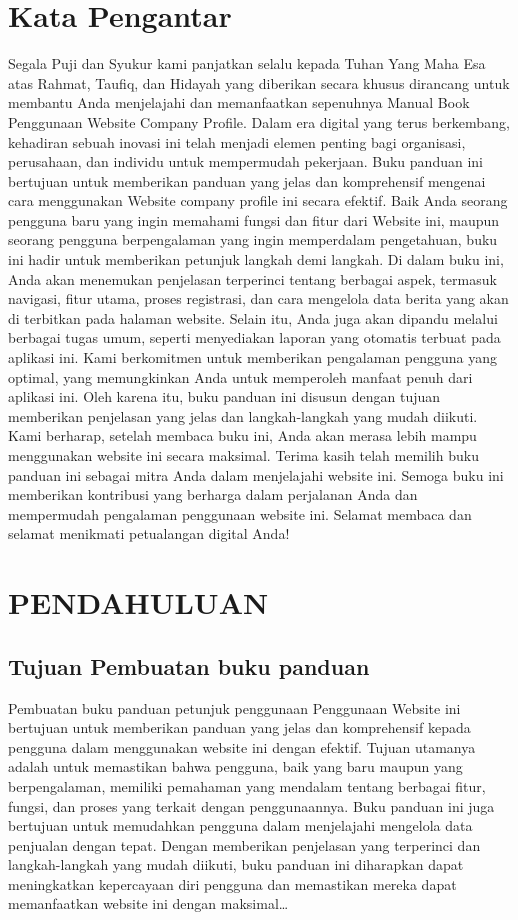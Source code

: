 \documentclass[a4paper,12 pt]{article}
\begin{document}
\section{Kata Pengantar}
Segala Puji dan Syukur kami panjatkan selalu kepada Tuhan Yang Maha Esa atas Rahmat, Taufiq, dan Hidayah yang diberikan secara khusus dirancang untuk membantu Anda menjelajahi dan memanfaatkan sepenuhnya Manual Book Penggunaan Website Company Profile. Dalam era digital yang terus berkembang, kehadiran sebuah inovasi ini telah menjadi elemen penting bagi organisasi, perusahaan, dan individu untuk mempermudah pekerjaan. 
Buku panduan ini bertujuan untuk memberikan panduan yang jelas dan komprehensif mengenai cara menggunakan Website company profile ini secara efektif. Baik Anda seorang pengguna baru yang ingin memahami fungsi dan fitur dari Website ini, maupun seorang pengguna berpengalaman yang ingin memperdalam pengetahuan, buku ini hadir untuk memberikan petunjuk langkah demi langkah. 
Di dalam buku ini, Anda akan menemukan penjelasan terperinci tentang berbagai aspek, termasuk navigasi, fitur utama, proses registrasi, dan cara mengelola data berita yang akan di terbitkan pada halaman website. Selain itu, Anda juga akan dipandu melalui berbagai tugas umum, seperti menyediakan laporan yang otomatis terbuat pada aplikasi ini. 
Kami berkomitmen untuk memberikan pengalaman pengguna yang optimal, yang memungkinkan Anda untuk memperoleh manfaat penuh dari aplikasi ini. Oleh karena itu, buku panduan ini disusun dengan tujuan memberikan penjelasan yang jelas dan langkah-langkah yang mudah diikuti. Kami berharap, setelah membaca buku ini, Anda akan merasa lebih mampu menggunakan website ini secara maksimal. 
Terima kasih telah memilih buku panduan ini sebagai mitra Anda dalam menjelajahi website ini. Semoga buku ini memberikan kontribusi yang berharga dalam perjalanan Anda dan mempermudah pengalaman penggunaan website ini. 
Selamat membaca dan selamat menikmati petualangan digital Anda!
\clearpage

\tableofcontents
\pagebreak
{}

\section{PENDAHULUAN}
\subsection{Tujuan Pembuatan buku panduan}
Pembuatan buku panduan petunjuk penggunaan Penggunaan Website ini bertujuan untuk memberikan panduan yang jelas dan komprehensif kepada pengguna dalam menggunakan website ini dengan efektif. Tujuan utamanya adalah untuk memastikan bahwa pengguna, baik yang baru maupun yang berpengalaman, memiliki pemahaman yang mendalam tentang berbagai fitur, fungsi, dan proses yang terkait dengan penggunaannya. Buku panduan ini juga bertujuan untuk memudahkan pengguna dalam menjelajahi mengelola data penjualan dengan tepat. 
Dengan memberikan penjelasan yang terperinci dan langkah-langkah yang mudah diikuti, buku panduan ini diharapkan dapat meningkatkan kepercayaan diri pengguna dan memastikan mereka dapat memanfaatkan website ini dengan maksimal\dots
\end{document}
